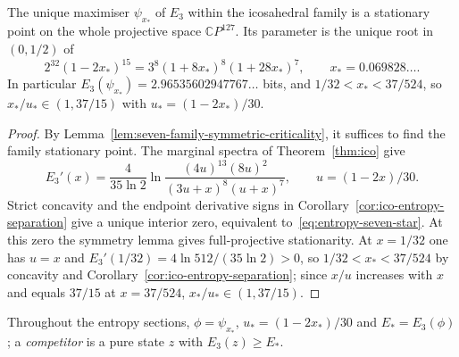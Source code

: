\begin{proposition}
\label{prop:entropy-seven-stationarity}
The unique maximiser \(\psi_{x_*}\) of \(E_3\) within the icosahedral
family is a stationary point on the whole projective space
\(\mathbb CP^{127}\). Its parameter is the unique root in \((0,1/2)\) of
\begin{equation}\label{eq:entropy-seven-star}
 2^{32}(1-2x_*)^{15}=3^8(1+8x_*)^8(1+28x_*)^7,
 \qquad x_*=0.069828\ldots.
\end{equation}
In particular \(E_3(\psi_{x_*})=2.96535602947767\ldots\) bits, and
\(1/32<x_*<37/524\), so \(x_*/u_*\in(1,37/15)\) with \(u_*=(1-2x_*)/30\).
\end{proposition}
\begin{proof}
By Lemma~\ref{lem:seven-family-symmetric-criticality}, it suffices to
find the family stationary point. The marginal spectra of
Theorem~\ref{thm:ico} give
\[
 E_3'(x)=\frac4{35\ln2}\ln
  \frac{(4u)^{13}(8u)^2}{(3u+x)^8(u+x)^7},
 \qquad u=(1-2x)/30.
\]
Strict concavity and the endpoint derivative signs in
Corollary~\ref{cor:ico-entropy-separation} give a unique interior
zero, equivalent to~\eqref{eq:entropy-seven-star}. At this zero the symmetry
lemma gives full-projective stationarity. At \(x=1/32\) one has \(u=x\) and
\(E_3'(1/32)=4\ln512/(35\ln2)>0\), so \(1/32<x_*<37/524\) by concavity
and Corollary~\ref{cor:ico-entropy-separation}; since \(x/u\) increases
with \(x\) and equals \(37/15\) at \(x=37/524\), \(x_*/u_*\in(1,37/15)\).
\end{proof}

Throughout the entropy sections, \(\phi=\psi_{x_*}\), \(u_*=(1-2x_*)/30\) and
\(E_*=E_3(\phi)\); a \emph{competitor} is a pure state \(z\) with \(E_3(z)\ge E_*\).
